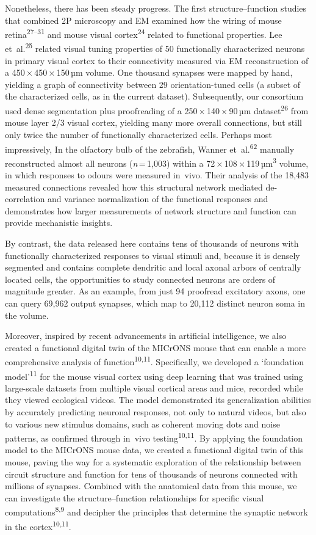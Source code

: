 \documentclass{article}
\begin{document}
Nonetheless, there has been steady progress. The first structure–function studies that combined 2P microscopy and EM examined how the wiring of mouse retina\textsuperscript{27–31} and mouse visual cortex\textsuperscript{24} related to functional properties. Lee et~al.\textsuperscript{25} related visual tuning properties of 50 functionally characterized neurons in primary visual cortex to their connectivity measured via EM reconstruction of a 450\,×\,450\,×\,150\,µm volume. One thousand synapses were mapped by hand, yielding a graph of connectivity between 29 orientation-tuned cells (a subset of the characterized cells, as in the current dataset). Subsequently, our consortium used dense segmentation plus proofreading of a 250\,×\,140\,×\,90\,µm dataset\textsuperscript{26} from mouse layer 2/3 visual cortex, yielding many more overall connections, but still only twice the number of functionally characterized cells. Perhaps most impressively, In the olfactory bulb of the zebrafish, Wanner et~al.\textsuperscript{62} manually reconstructed almost all neurons (\emph{n}\,=\,1,003) within a 72\,×\,108\,×\,119\,µm\textsuperscript{3} volume, in which responses to odours were measured in~vivo. Their analysis of the 18,483 measured connections revealed how this structural network mediated de-correlation and variance normalization of the functional responses and demonstrates how larger measurements of network structure and function can provide mechanistic insights.

By contrast, the data released here contains tens of thousands of neurons with functionally characterized responses to visual stimuli and, because it is densely segmented and contains complete dendritic and local axonal arbors of centrally located cells, the opportunities to study connected neurons are orders of magnitude greater. As an example, from just 94 proofread excitatory axons, one can query 69,962 output synapses, which map to 20,112 distinct neuron soma in the volume.

Moreover, inspired by recent advancements in artificial intelligence, we also created a functional digital twin of the MICrONS mouse that can enable a more comprehensive analysis of function\textsuperscript{10,11}. Specifically, we developed a ‘foundation model’\textsuperscript{11} for the mouse visual cortex using deep learning that was trained using large-scale datasets from multiple visual cortical areas and mice, recorded while they viewed ecological videos. The model demonstrated its generalization abilities by accurately predicting neuronal responses, not only to natural videos, but also to various new stimulus domains, such as coherent moving dots and noise patterns, as confirmed through in~vivo testing\textsuperscript{10,11}. By applying the foundation model to the MICrONS mouse data, we created a functional digital twin of this mouse, paving the way for a systematic exploration of the relationship between circuit structure and function for tens of thousands of neurons connected with millions of synapses. Combined with the anatomical data from this mouse, we can investigate the structure–function relationships for specific visual computations\textsuperscript{8,9} and decipher the principles that determine the synaptic network in the cortex\textsuperscript{10,11}.
\end{document}

